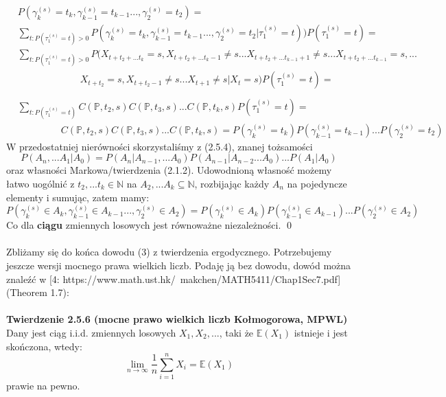 \documentclass[a4paper]{article}
\begin{document}
\begin{align*}
    &P(\gamma_k^{(s)} = t_k, \gamma_{k-1}^{(s)} = t_{k-1} ..., \gamma_2^{(s)} = t_2) =\\
    &\sum\limits_{t: P(\tau_1^{(s)} = t) > 0} P(\gamma_k^{(s)} =t_k, \gamma_{k-1}^{(s)} = t_{k-1} ..., \gamma_2^{(s)} = t_2 | \tau_1^{(s)} = t))P(\tau_1^{(s)} = t) =\\
    &\sum\limits_{t: P(\tau_1^{(s)} = t) > 0} P(X_{t+t_2+...t_k} = s, X_{t+t_2+...t_k - 1} \neq s ... X_{t+t_2+...t_{k-1} + 1} \neq s ... X_{t+t_2+...t_{k-1}} = s, ...\\
    &\quad\quad\quad\quad\quad\quad\,\,\, X_{t+t_2} = s, X_{t+t_2 - 1} \neq s ... X_{t+1} \neq s|X_t = s)P(\tau_1^{(s)} = t) = \\\\
    &\sum\limits_{t: P(\tau_1^{(s)} = t)} C(\mathbb{P}, t_2, s)C(\mathbb{P}, t_3, s)...C(\mathbb{P}, t_k, s)P(\tau_1^{(s)} = t) =\\
    &\quad\quad\quad\quad\,\,\, C(\mathbb{P}, t_2, s)C(\mathbb{P}, t_3, s)...C(\mathbb{P}, t_k, s) = P(\gamma_k^{(s)} = t_k) P(\gamma_{k-1}^{(s)} = t_{k-1}) ...P(\gamma_2^{(s)} = t_2)
\end{align*}
W przedostatniej nierówności skorzystaliśmy z (2.5.4), znanej tożsamości
$$P(A_n, ... A_1|A_0) = P(A_n|A_{n-1}, ...A_0)P(A_{n-1}|A_{n-2}...A_0)...P(A_1|A_0)$$
oraz własności Markowa/twierdzenia (2.1.2). Udowodnioną własność możemy łatwo uogólnić z $t_2, ... t_k \in \mathbb{N}$ na $A_2, ... A_k \subseteq \mathbb{N}$, rozbijając każdy $A_n$ na pojedyncze elementy i sumując, zatem mamy:
$$P(\gamma_k^{(s)} \in A_k, \gamma_{k-1}^{(s)} \in A_{k-1} ..., \gamma_2^{(s)} \in A_2) = P(\gamma_k^{(s)} \in A_k) P(\gamma_{k-1}^{(s)} \in A_{k-1}) ...P(\gamma_2^{(s)} \in A_{2})$$
Co dla \textbf{ciągu} zmiennych losowych jest równoważne niezależności. \qed
\\\\
Zbliżamy się do końca dowodu (3) z twierdzenia ergodycznego. Potrzebujemy jeszcze wersji mocnego prawa wielkich liczb. Podaję ją bez dowodu, dowód można znaleźć w [4: https://www.math.ust.hk/~makchen/MATH5411/Chap1Sec7.pdf] (Theorem 1.7):\\\\
\textbf{Twierdzenie 2.5.6 (mocne prawo wielkich liczb Kołmogorowa, MPWL)}\\
Dany jest ciąg i.i.d. zmiennych losowych $X_1, X_2, ... $, taki że $\mathbb{E}(X_1)$ istnieje i jest skończona, wtedy:
$$ \lim\limits_{n \to \infty} \frac{1}{n}\sum\limits_{i=1}^n X_i = \mathbb{E}(X_1)$$
prawie na pewno.
\end{document}
